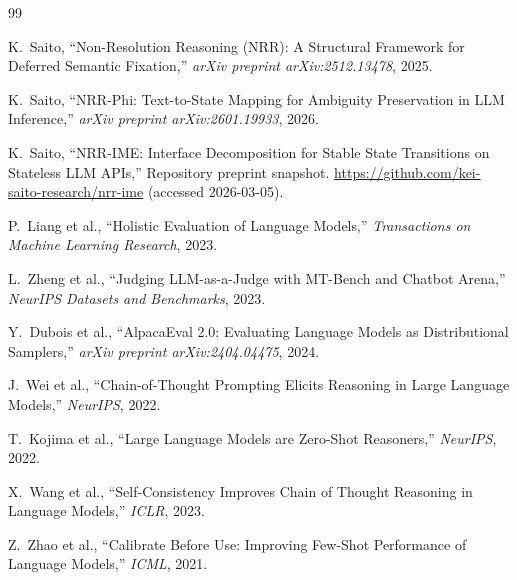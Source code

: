 \documentclass[11pt,a4paper]{article}
\begin{document}
\begin{thebibliography}{99}

K.~Saito,
\newblock ``Non-Resolution Reasoning (NRR): A Structural Framework for Deferred Semantic Fixation,''
\newblock \emph{arXiv preprint arXiv:2512.13478}, 2025.

K.~Saito,
\newblock ``NRR-Phi: Text-to-State Mapping for Ambiguity Preservation in LLM Inference,''
\newblock \emph{arXiv preprint arXiv:2601.19933}, 2026.

K.~Saito,
\newblock ``NRR-IME: Interface Decomposition for Stable State Transitions on Stateless LLM APIs,''
\newblock Repository preprint snapshot. \url{https://github.com/kei-saito-research/nrr-ime} (accessed 2026-03-05).

P.~Liang et al.,
\newblock ``Holistic Evaluation of Language Models,''
\newblock \emph{Transactions on Machine Learning Research}, 2023.

L.~Zheng et al.,
\newblock ``Judging LLM-as-a-Judge with MT-Bench and Chatbot Arena,''
\newblock \emph{NeurIPS Datasets and Benchmarks}, 2023.

Y.~Dubois et al.,
\newblock ``AlpacaEval 2.0: Evaluating Language Models as Distributional Samplers,''
\newblock \emph{arXiv preprint arXiv:2404.04475}, 2024.

J.~Wei et al.,
\newblock ``Chain-of-Thought Prompting Elicits Reasoning in Large Language Models,''
\newblock \emph{NeurIPS}, 2022.

T.~Kojima et al.,
\newblock ``Large Language Models are Zero-Shot Reasoners,''
\newblock \emph{NeurIPS}, 2022.

X.~Wang et al.,
\newblock ``Self-Consistency Improves Chain of Thought Reasoning in Language Models,''
\newblock \emph{ICLR}, 2023.

Z.~Zhao et al.,
\newblock ``Calibrate Before Use: Improving Few-Shot Performance of Language Models,''
\newblock \emph{ICML}, 2021.

\end{thebibliography}
\end{document}
